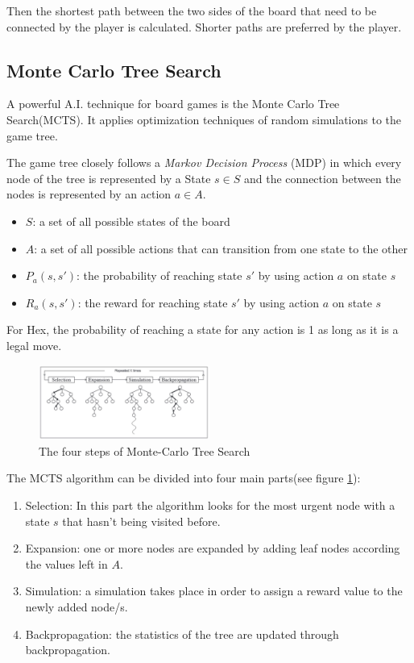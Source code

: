 \documentclass{ba-kecs}
\begin{document}
Then the shortest path between the two sides of the board that need to be connected by the player is calculated. Shorter paths are preferred by the player. 

\subsection{Monte Carlo Tree Search}
A powerful A.I. technique for board games is the Monte Carlo Tree Search(MCTS). It applies optimization techniques of random simulations to the game tree. 

The game tree closely follows a \textit{Markov Decision Process} (MDP) in which every node of the tree is represented by a State $s \in S$ and the connection between the nodes is represented by an action $a \in A$.
\begin{itemize}
\item $S$: a set of all possible states of the board
\item $A$: a set of all possible actions that can transition from one state to the other
\item $P_a(s, s')$: the probability of reaching state $s'$ by using action $a$ on state $s$
\item $R_a(s, s')$: the reward for reaching state $s'$ by using action $a$ on state $s$
\end{itemize}

For Hex, the probability of reaching a state for any action is 1 as long as it is a legal move. 
\begin{figure}
	\centering
	\includegraphics[width=0.5\textwidth]{figure_mcts.jpg}
	\caption{The four steps of Monte-Carlo Tree Search \cite{chaslot2008progressive}}
	\label{fig:mcts}
	\end{figure}
The MCTS algorithm can be divided into four main parts(see figure \ref{fig:mcts}): 
\begin{enumerate}
\item Selection: In this part the algorithm looks for the most urgent node with a state $s$ that hasn't being visited before.
\item Expansion: one or more nodes are expanded by adding leaf nodes according the values left in $A$.
\item Simulation: a simulation takes place in order to assign a reward value to the newly added node/s.
\item Backpropagation: the statistics of the tree are updated through backpropagation.
\end{enumerate}
\end{document}
